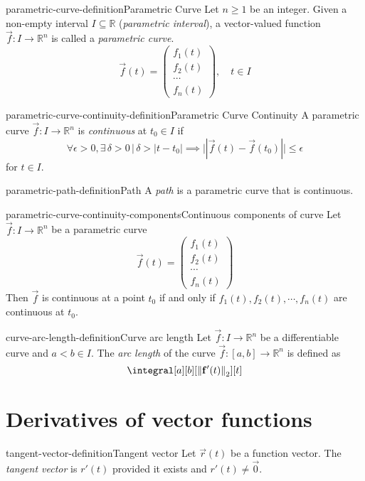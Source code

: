 \documentclass[preview]{standalone}
\begin{document}
\genpage

\begin{snippetdefinition}{parametric-curve-definition}{Parametric Curve}
    Let \(n \geq 1\) be an integer.
    Given a non-empty interval \(I \subseteq \mathbb{R}\)
    (\textit{parametric interval}), a vector-valued function \(\vec{f}: I\to{\mathbb{R}}^n\)
    is called a \textit{parametric curve}.
    \[
        \vec{f}(t) = \begin{pmatrix}
            f_1(t) \\
            f_2(t) \\
            \cdots \\
            f_n(t)
        \end{pmatrix}, \quad t \in I
    \]
\end{snippetdefinition}

\begin{snippetdefinition}{parametric-curve-continuity-definition}{Parametric Curve Continuity}
    A parametric curve \(\vec{f}: I \to {\mathbb{R}}^n\)
    is \textit{continuous} at \(t_0 \in I\)
    if
    \[
        \forall \epsilon > 0, 
        \exists \, \delta > 0 \,|\, \delta > |t-t_0|
        \implies ||\vec{f}(t) - \vec{f}(t_0)|| \leq \epsilon
    \]
    for \(t \in I\).
\end{snippetdefinition}

\begin{snippetdefinition}{parametric-path-definition}{Path}
    A \textit{path} is a parametric curve
    that is continuous.
\end{snippetdefinition}

\begin{snippetproposition}{parametric-curve-continuity-components}{Continuous components of curve}
    Let \(\vec{f}: I \to {\mathbb{R}}^n\) be a parametric curve
    \[
        \vec{f}(t) = \begin{pmatrix}
                f_1(t) \\
                f_2(t) \\
                \cdots \\
                f_n(t)
        \end{pmatrix}
    \]
    Then \(\vec{f}\) is continuous at a point \(t_0\) if and only if
    \(f_1(t), f_2(t), \cdots, f_n(t)\) are continuous at \(t_0\).
\end{snippetproposition}

\begin{snippetdefinition}{curve-arc-length-definition}{Curve arc length}
    Let \(\vec{f}:I\to{\mathbb{R}}^n\) be a differentiable curve
    and \(a < b \in I\).
    The \textit{arc length} of the curve \(\vec{f}:[a,b] \to {\mathbb{R}}^n\)
    is defined as
    \[
        \integral[a][b][\left\|\mathbf{f}^{\prime}(t)\right\|_2][t]
    \]
\end{snippetdefinition}

\section{Derivatives of vector functions}

\begin{snippetdefinition}{tangent-vector-definition}{Tangent vector}
    Let \(\vec{r}(t)\) be a function vector.
    The \textit{tangent vector} is \(r'(t)\) provided it exists and \(r'(t)\neq\vec{0}\).
\end{snippetdefinition}
\end{document}
